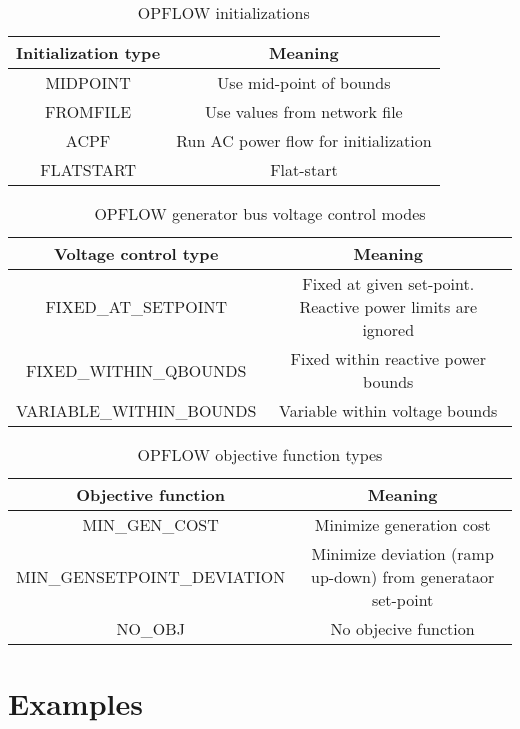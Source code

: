 \begin{table}[!htbp]
  \centering
  \caption{OPFLOW initializations}
  \begin{tabular}{|c|c|}
    \hline
    \textbf{Initialization type} & \textbf{Meaning} \\ \hline
    MIDPOINT & Use mid-point of bounds \\ \hline
    FROMFILE & Use values from network file \\ \hline
    ACPF & Run AC power flow for initialization \\ \hline
    FLATSTART & Flat-start \\ \hline
  \end{tabular}
\label{tab:opflow_initializations}
\end{table}

\begin{table}[!htbp]
  \centering
  \caption{OPFLOW generator bus voltage control modes}
  \begin{tabular}{|c|c|}
    \hline
    \textbf{Voltage control type} & \textbf{Meaning} \\ \hline
    FIXED\_AT\_SETPOINT & Fixed at given set-point. Reactive power limits are ignored \\ \hline
    FIXED\_WITHIN\_QBOUNDS & Fixed within reactive power bounds \\ \hline
    VARIABLE\_WITHIN\_BOUNDS & Variable within voltage bounds \\ \hline
  \end{tabular}
\label{tab:opflow_genbusvoltage}
\end{table}

\begin{table}[!htbp]
  \centering
  \caption{OPFLOW objective function types}
  \begin{tabular}{|c|c|}
    \hline
    \textbf{Objective function} & \textbf{Meaning} \\ \hline
    MIN\_GEN\_COST & Minimize generation cost \\ \hline
    MIN\_GENSETPOINT\_DEVIATION & Minimize deviation (ramp up-down) from generataor set-point \\ \hline
    NO\_OBJ & No objecive function \\ \hline
  \end{tabular}
\label{tab:opflow_objtypes}
\end{table}


\section{Examples}

